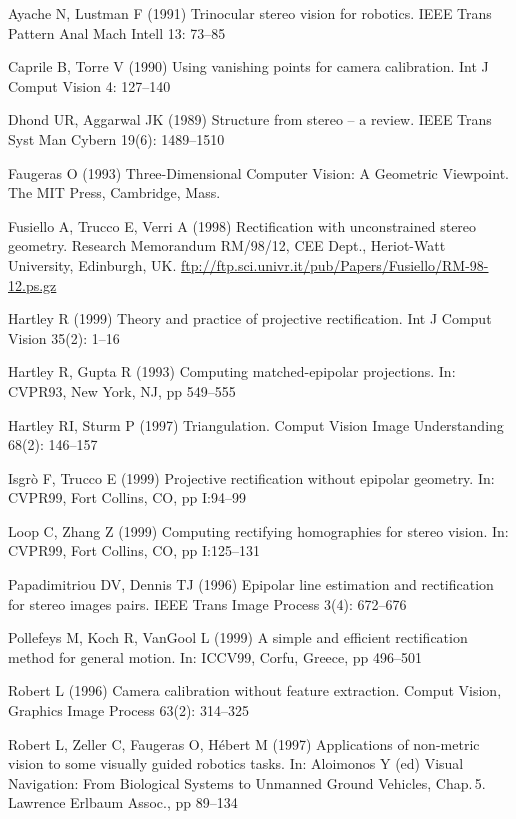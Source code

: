 \documentclass[a4paper,twocolumn,zihao=5,fontset=none,UTF8]{ctexart}
\begin{document}
\begin{enumerate}[label={[\arabic*]},leftmargin=2.2em,itemsep=1pt]
\item Ayache N, Lustman F (1991) Trinocular stereo vision for robotics. IEEE Trans Pattern Anal Mach Intell 13: 73--85
\item Caprile B, Torre V (1990) Using vanishing points for camera calibration. Int J Comput Vision 4: 127--140
\item Dhond UR, Aggarwal JK (1989) Structure from stereo -- a review. IEEE Trans Syst Man Cybern 19(6): 1489--1510
\item Faugeras O (1993) Three-Dimensional Computer Vision: A Geometric Viewpoint. The MIT Press, Cambridge, Mass.
\item Fusiello A, Trucco E, Verri A (1998) Rectification with unconstrained stereo geometry. Research Memorandum RM/98/12, CEE Dept., Heriot-Watt University, Edinburgh, UK. \url{ftp://ftp.sci.univr.it/pub/Papers/Fusiello/RM-98-12.ps.gz}
\item Hartley R (1999) Theory and practice of projective rectification. Int J Comput Vision 35(2): 1--16
\item Hartley R, Gupta R (1993) Computing matched-epipolar projections. In: CVPR93, New York, NJ, pp 549--555
\item Hartley RI, Sturm P (1997) Triangulation. Comput Vision Image Understanding 68(2): 146--157
\item Isgr\`o F, Trucco E (1999) Projective rectification without epipolar geometry. In: CVPR99, Fort Collins, CO, pp I:94--99
\item Loop C, Zhang Z (1999) Computing rectifying homographies for stereo vision. In: CVPR99, Fort Collins, CO, pp I:125--131
\item Papadimitriou DV, Dennis TJ (1996) Epipolar line estimation and rectification for stereo images pairs. IEEE Trans Image Process 3(4): 672--676
\item Pollefeys M, Koch R, VanGool L (1999) A simple and efficient rectification method for general motion. In: ICCV99, Corfu, Greece, pp 496--501
\item Robert L (1996) Camera calibration without feature extraction. Comput Vision, Graphics Image Process 63(2): 314--325
\item Robert L, Zeller C, Faugeras O, H\'ebert M (1997) Applications of non-metric vision to some visually guided robotics tasks. In: Aloimonos Y (ed) Visual Navigation: From Biological Systems to Unmanned Ground Vehicles, Chap.\,5. Lawrence Erlbaum Assoc., pp 89--134
\end{enumerate}
\endgroup
\end{document}
